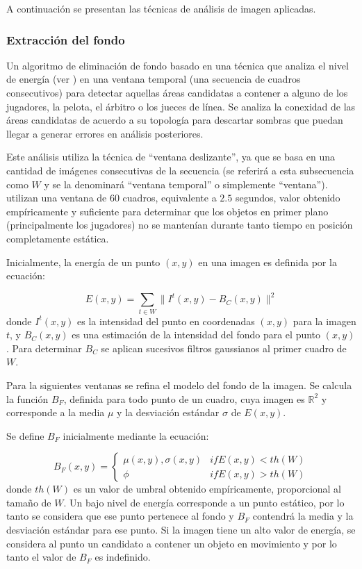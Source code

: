 A continuación se presentan las técnicas de análisis de imagen aplicadas.

\subsubsection{Extracción del fondo}
Un algoritmo de eliminación de fondo basado en una técnica que analiza el nivel
de energía (ver \cite{tanos-cita-21}) en una ventana temporal (una secuencia de
cuadros consecutivos) para detectar aquellas áreas candidatas a contener a
alguno de los jugadores, la pelota, el árbitro o los jueces de línea. Se
analiza la conexidad de las áreas candidatas de acuerdo a su topología para
descartar sombras que puedan llegar a generar errores en análisis posteriores.

Este análisis utiliza la técnica de ``ventana deslizante'', ya que
se basa en una cantidad de imágenes consecutivas de la secuencia (se referirá a
esta subsecuencia como $W$ y se la denominará ``ventana temporal'' o simplemente
``ventana''). \citeauthor*{papers-tanos} utilizan una ventana de 60 cuadros,
equivalente a $2.5$ segundos, valor obtenido empíricamente y suficiente para
determinar que los objetos en primer plano (principalmente los jugadores) no
se mantenían durante tanto tiempo en posición completamente estática.

Inicialmente, la energía de un punto $(x, y)$ en una imagen es definida por la
ecuación:

\begin{equation}
    \label{eq:tanos-energy}
    E(x, y) = \sum_{t \in W} \| I^t(x, y) - B_C (x, y) \| ^2
\end{equation}
donde  $I^t(x, y)$ es la intensidad del punto en coordenadas $(x, y)$ para la
imagen $t$, y $B_C(x, y)$ es una estimación de la intensidad del fondo para el
punto $(x, y)$. Para determinar $B_C$ se aplican sucesivos filtros gaussianos
al primer cuadro de $W$.

Para la siguientes ventanas se refina el modelo del fondo de la imagen. Se
calcula la función $B_F$, definida para todo punto de un cuadro, cuya imagen es
$\mathbb{R}^2$ y corresponde a la media $\mu$ y la desviación estándar $\sigma$ de $E(x, y)$.

Se define $B_F$ inicialmente mediante la ecuación:

\begin{equation}
  \label{eq:tanos-bf1}
  B_F(x, y) =
  \begin{cases}
    \mu(x, y), \sigma(x, y) & if E(x, y) < th(W) \\
    \phi & if E(x, y) > th(W)
  \end{cases}
\end{equation}
donde $th(W)$ es un valor de umbral obtenido empíricamente, proporcional al
tamaño de $W$. Un bajo nivel de energía corresponde a un punto estático,
por lo tanto se considera que ese punto pertenece al fondo y $B_F$
contendrá la media y la desviación estándar para ese punto. Si la imagen
tiene un alto valor de energía, se considera al punto un candidato a
contener un objeto en movimiento y por lo tanto el valor de $B_F$ es
indefinido.

